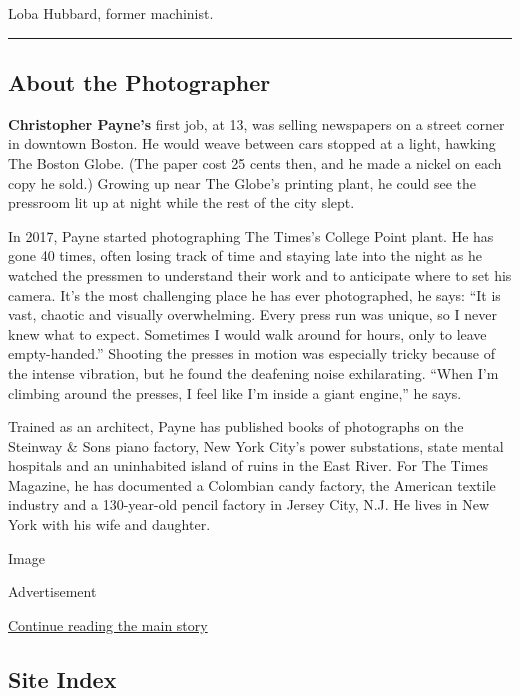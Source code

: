 Loba Hubbard, former machinist.

\begin{center}\rule{0.5\linewidth}{\linethickness}\end{center}

\hypertarget{about-the-photographer}{%
\subsection{About the Photographer}\label{about-the-photographer}}

\textbf{Christopher Payne's} first job, at 13, was selling newspapers on
a street corner in downtown Boston. He would weave between cars stopped
at a light, hawking The Boston Globe. (The paper cost 25 cents then, and
he made a nickel on each copy he sold.) Growing up near The Globe's
printing plant, he could see the pressroom lit up at night while the
rest of the city slept.

In 2017, Payne started photographing The Times's College Point plant. He
has gone 40 times, often losing track of time and staying late into the
night as he watched the pressmen to understand their work and to
anticipate where to set his camera. It's the most challenging place he
has ever photographed, he says: ``It is vast, chaotic and visually
overwhelming. Every press run was unique, so I never knew what to
expect. Sometimes I would walk around for hours, only to leave
empty-handed.'' Shooting the presses in motion was especially tricky
because of the intense vibration, but he found the deafening noise
exhilarating. ``When I'm climbing around the presses, I feel like I'm
inside a giant engine,'' he says.

Trained as an architect, Payne has published books of photographs on the
Steinway \& Sons piano factory, New York City's power substations, state
mental hospitals and an uninhabited island of ruins in the East River.
For The Times Magazine, he has documented a Colombian candy factory, the
American textile industry and a 130-year-old pencil factory in Jersey
City, N.J. He lives in New York with his wife and daughter.

Image

Advertisement

\protect\hyperlink{after-bottom}{Continue reading the main story}

\hypertarget{site-index}{%
\subsection{Site Index}\label{site-index}}


